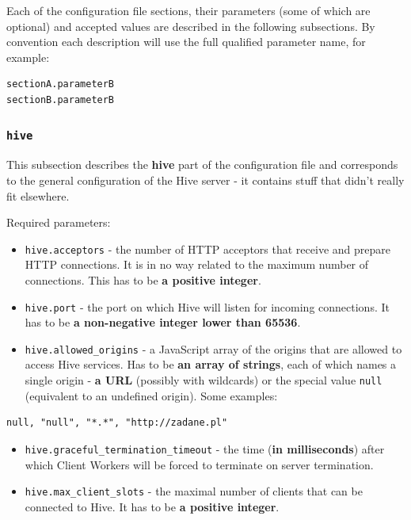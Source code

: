 \documentclass[a4paper]{article}
\begin{document}
Each of the configuration file sections, their parameters (some of which are optional) and accepted values are described in the following subsections. By convention each description will use the full qualified parameter name, for example:


\begin{verbatim}
sectionA.parameterB
sectionB.parameterB
\end{verbatim}
\subsubsection{\texttt{hive}}
\label{sec-3-1-1}

This subsection describes the \textbf{hive} part of the configuration file and corresponds to the general configuration of the Hive server - it contains stuff that didn't really fit elsewhere.

\noindent
Required parameters:

\begin{itemize}
\item \texttt{hive.acceptors} - the number of HTTP acceptors that receive and prepare HTTP connections. It is in no way related to the maximum number of connections. This has to be \textbf{a positive integer}.
\item \texttt{hive.port} - the port on which Hive will listen for incoming connections. It has to be \textbf{a non-negative integer lower than 65536}.
\item \texttt{hive.allowed\_origins} - a JavaScript array of the origins that are allowed to access Hive services. Has to be \textbf{an array of strings}, each of which names a single origin - \textbf{a URL} (possibly with wildcards) or the special value \texttt{null} (equivalent to an undefined origin). Some examples:
\end{itemize}


\begin{verbatim}
null, "null", "*.*", "http://zadane.pl"
\end{verbatim}




\label{ref-graceful_config}

\begin{itemize}
\item \texttt{hive.graceful\_termination\_timeout} - the time (\textbf{in milliseconds}) after which Client Workers will be forced to terminate on server termination.
\item \texttt{hive.max\_client\_slots} - the maximal number of clients that can be connected to Hive. It has to be \textbf{a positive integer}.
\end{itemize}
\end{document}
